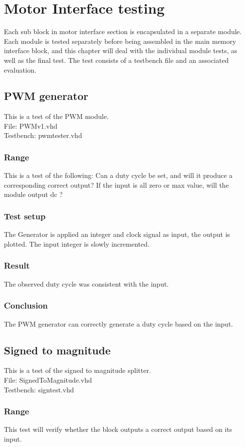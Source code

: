 \chapter{Motor Interface testing} \label{sec:llctest}
Each sub block in motor interface section is encapsulated in a separate module.
Each module is tested separately before being assembled in the main memory interface block, and this chapter will deal with the individual module tests, as well as the final test.
The test consists of a testbench file and an associated evaluation.

\section{PWM generator}
This is a test of the PWM module.\\
File: PWMv1.vhd\\
Testbench: pwmtester.vhd
\subsection{Range}
This is a test of the following: Can a duty cycle be set, and will it produce a corresponding correct output?
If the input is all zero or max value, will the module output dc ?
\subsection{Test setup}
The Generator is applied an integer and clock signal as input, the output is plotted. The input integer is slowly incremented.
\subsection{Result}
The observed duty cycle was consistent with the input.
\subsection{Conclusion}
The PWM generator can correctly generate a duty cycle based on the input.



\section{Signed to magnitude}
This is a test of the signed to magnitude splitter.\\
File: SignedToMagnitude.vhd\\
Testbench: signtest.vhd

\subsection{Range}
This test will verify whether the block outputs a correct output based on its input.

